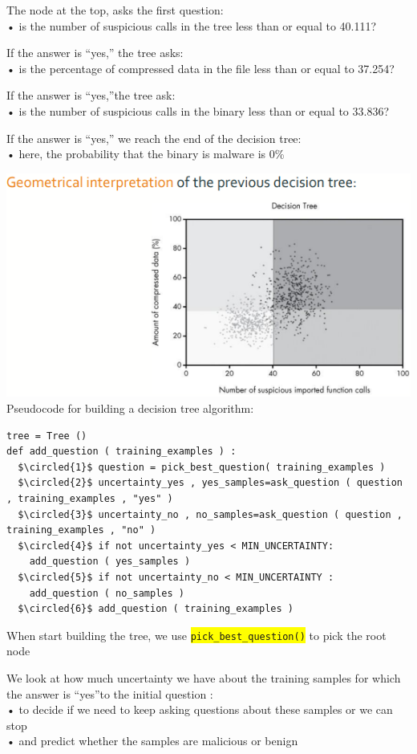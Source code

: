\documentclass[]{project_plan}
\newcommand*\circled[1]{\tikz[baseline=(char.base)]{
            \node[shape=circle,draw,inner sep=2pt] (char) {#1};}}
\begin{document}
The node at the top, asks the first question:\\
• is the number of suspicious calls in the tree less than or equal to 40.111?

If the answer is “yes,” the tree asks:\\
• is the percentage of compressed data in the file less than or equal to 37.254?

If the answer is “yes,”the tree ask:\\
• is the number of suspicious calls in the binary less than or equal to 33.836?

If the answer is “yes,” we reach the end of the decision tree:\\
• here, the probability that the binary is malware is 0\%

\includegraphics[width=.8\linewidth]{ml72.png}
\newpage
Pseudocode for building a decision tree algorithm:
\begin{lstlisting}[mathescape]
tree = Tree ()
def add_question ( training_examples ) :
  $\circled{1}$ question = pick_best_question( training_examples )
  $\circled{2}$ uncertainty_yes , yes_samples=ask_question ( question , training_examples , "yes" )
  $\circled{3}$ uncertainty_no , no_samples=ask_question ( question , training_examples , "no" )
  $\circled{4}$ if not uncertainty_yes < MIN_UNCERTAINTY:
    add_question ( yes_samples )
  $\circled{5}$ if not uncertainty_no < MIN_UNCERTAINTY :
    add_question ( no_samples )
  $\circled{6}$ add_question ( training_examples )
\end{lstlisting}

When start building the tree, we use \colorbox{yellow}{\lstinline|pick_best_question()|} to pick the root node \circled{1}

We look at how much uncertainty we have about the training samples for which the
answer is “yes”to the initial question \circled{2}:\\
• to decide if we need to keep asking questions about these samples or we can stop\\
• and predict whether the samples are malicious or benign
\end{document}

